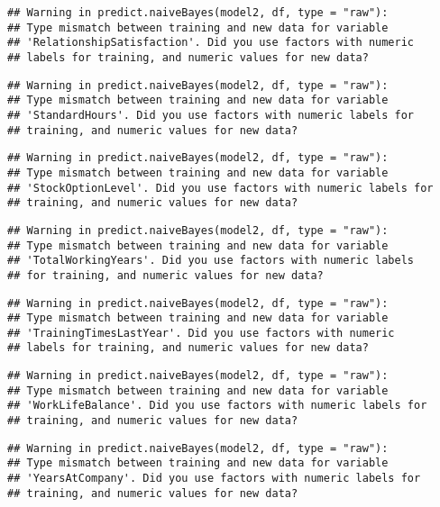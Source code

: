 \documentclass[
]{article}
\begin{document}
\begin{verbatim}
## Warning in predict.naiveBayes(model2, df, type = "raw"):
## Type mismatch between training and new data for variable
## 'RelationshipSatisfaction'. Did you use factors with numeric
## labels for training, and numeric values for new data?
\end{verbatim}

\begin{verbatim}
## Warning in predict.naiveBayes(model2, df, type = "raw"):
## Type mismatch between training and new data for variable
## 'StandardHours'. Did you use factors with numeric labels for
## training, and numeric values for new data?
\end{verbatim}

\begin{verbatim}
## Warning in predict.naiveBayes(model2, df, type = "raw"):
## Type mismatch between training and new data for variable
## 'StockOptionLevel'. Did you use factors with numeric labels for
## training, and numeric values for new data?
\end{verbatim}

\begin{verbatim}
## Warning in predict.naiveBayes(model2, df, type = "raw"):
## Type mismatch between training and new data for variable
## 'TotalWorkingYears'. Did you use factors with numeric labels
## for training, and numeric values for new data?
\end{verbatim}

\begin{verbatim}
## Warning in predict.naiveBayes(model2, df, type = "raw"):
## Type mismatch between training and new data for variable
## 'TrainingTimesLastYear'. Did you use factors with numeric
## labels for training, and numeric values for new data?
\end{verbatim}

\begin{verbatim}
## Warning in predict.naiveBayes(model2, df, type = "raw"):
## Type mismatch between training and new data for variable
## 'WorkLifeBalance'. Did you use factors with numeric labels for
## training, and numeric values for new data?
\end{verbatim}

\begin{verbatim}
## Warning in predict.naiveBayes(model2, df, type = "raw"):
## Type mismatch between training and new data for variable
## 'YearsAtCompany'. Did you use factors with numeric labels for
## training, and numeric values for new data?
\end{verbatim}
\end{document}

